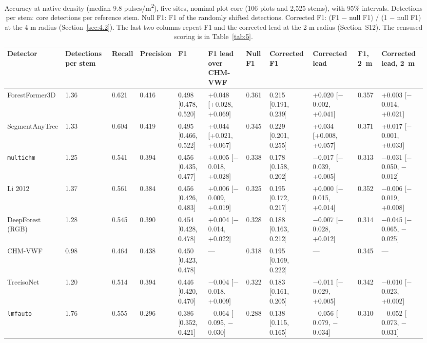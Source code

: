 \documentclass[journal]{IEEEtran}
\begin{document}
\begin{table}[!tp]
\caption{Accuracy at native density (median 9.8 pulses/m\textsuperscript{2}), five sites,
nominal plot core (106 plots and 2,525 stems), with 95\% intervals. Detections
per stem: core detections per reference stem. Null F1: F1 of the randomly
shifted detections. Corrected F1: (F1 $-$ null F1) / (1 $-$ null F1) at the 4 m
radius (Section~\ref{sec:4.2}). The last two columns repeat F1 and the corrected lead at
the 2 m radius (Section~S12). The censused scoring is in Table~\ref{tab:5}.}
\label{tab:3}
\centering
\scriptsize
\setlength{\tabcolsep}{3pt}
\renewcommand{\arraystretch}{1.15}
\begin{tabularx}{\textwidth}{LLllLLlLLlL}
\hline
Detector & Detections per stem & Recall & Precision & F1 & F1 lead over CHM-VWF & Null F1 & Corrected F1 & Corrected lead & F1, 2~m & Corrected lead, 2~m \\
\hline
ForestFormer3D & 1.36 & 0.621 & 0.416 & 0.498 [0.478, 0.520] & +0.048 [+0.028, +0.069] & 0.361 & 0.215 [0.191, 0.239] & +0.020 [$-$0.002, +0.041] & 0.357 & +0.003 [$-$0.014, +0.021] \\
SegmentAnyTree & 1.33 & 0.604 & 0.419 & 0.495 [0.466, 0.522] & +0.044 [+0.021, +0.067] & 0.345 & 0.229 [0.201, 0.255] & +0.034 [+0.008, +0.057] & 0.371 & +0.017 [$-$0.001, +0.033] \\
\texttt{multichm} & 1.25 & 0.541 & 0.394 & 0.456 [0.435, 0.477] & +0.005 [$-$0.018, +0.028] & 0.338 & 0.178 [0.158, 0.202] & $-$0.017 [$-$0.039, +0.005] & 0.313 & $-$0.031 [$-$0.050, $-$0.012] \\
Li 2012 & 1.37 & 0.561 & 0.384 & 0.456 [0.426, 0.483] & +0.006 [$-$0.009, +0.019] & 0.325 & 0.195 [0.172, 0.217] & +0.000 [$-$0.015, +0.014] & 0.352 & $-$0.006 [$-$0.019, +0.008] \\
DeepForest (RGB) & 1.28 & 0.545 & 0.390 & 0.454 [0.428, 0.478] & +0.004 [$-$0.014, +0.022] & 0.328 & 0.188 [0.163, 0.212] & $-$0.007 [$-$0.028, +0.012] & 0.314 & $-$0.045 [$-$0.065, $-$0.025] \\
CHM-VWF & 0.98 & 0.464 & 0.438 & 0.450 [0.423, 0.478] & --- & 0.318 & 0.195 [0.169, 0.222] & --- & 0.345 & --- \\
TreeisoNet & 1.20 & 0.514 & 0.394 & 0.446 [0.420, 0.470] & $-$0.004 [$-$0.018, +0.009] & 0.322 & 0.183 [0.161, 0.205] & $-$0.011 [$-$0.029, +0.005] & 0.342 & $-$0.010 [$-$0.023, +0.002] \\
\texttt{lmfauto} & 1.76 & 0.555 & 0.296 & 0.386 [0.352, 0.421] & $-$0.064 [$-$0.095, $-$0.030] & 0.288 & 0.138 [0.115, 0.165] & $-$0.056 [$-$0.079, $-$0.034] & 0.310 & $-$0.052 [$-$0.073, $-$0.031] \\

\end{tabularx}
\end{table}
\end{document}
